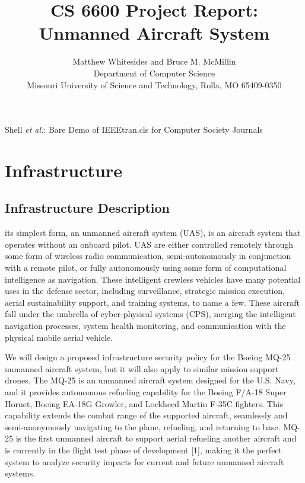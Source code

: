 \documentclass[10pt,journal,compsoc]{IEEEtran}
\begin{document}
\title{CS 6600 Project Report: Unmanned Aircraft System}

\author{Matthew Whitesides and Bruce M. McMillin \\
Department of Computer Science \\
Missouri University of Science and Technology, Rolla, MO 65409-0350} 

%
{Shell \MakeLowercase{\textit{et al.}}: Bare Demo of IEEEtran.cls for Computer Society Journals}
 

\maketitle

\IEEEpeerreviewmaketitle


\section{Infrastructure}

\subsection{Infrastructure Description}

 its simplest form, an unmanned aircraft system (UAS), is an aircraft system that operates without an onboard pilot. 
UAS are either controlled remotely through some form of wireless radio communication, semi-autonomously in conjunction with a remote pilot, or fully autonomously using some form of computational intelligence as navigation. 
These intelligent crewless vehicles have many potential uses in the defense sector, including surveillance, strategic mission execution, aerial sustainability support, and training systems, to name a few. 
These aircraft fall under the umbrella of cyber-physical systems (CPS), merging the intelligent navigation processes, system health monitoring, and communication with the physical mobile aerial vehicle.

We will design a proposed infrastructure security policy for the Boeing MQ-25 unmanned aircraft system, but it will also apply to similar mission support drones. 
The MQ-25 is an unmanned aircraft system designed for the U.S. Navy, and it provides autonomous refueling capability for the Boeing F/A-18 Super Hornet, Boeing EA-18G Growler, and Lockheed Martin F-35C fighters.
This capability extends the combat range of the supported aircraft, seamlessly and semi-anonymously navigating to the plane, refueling, and returning to base. 
MQ-25 is the first unmanned aircraft to support aerial refueling another aircraft and is currently in the flight test phase of development [1], making it the perfect system to analyze security impacts for current and future unmanned aircraft systems. 
\end{document}
